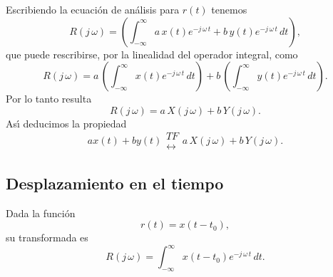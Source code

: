 Escribiendo la ecuaci\'{o}n de an\'{a}lisis para $r\left( t\right)$
tenemos
\begin{equation}
        R\left( j \, \omega \right) =
        \left( \int_{-\infty }^{\infty } a \, x\left( t\right)e^{-j \, \omega \, t} + b \, y\left( t\right)e^{-j \, \omega \, t} \, dt\right),
\end{equation}
que puede rescribirse, por la linealidad del operador integral, como
\begin{equation}
        R\left( j \, \omega \right) =
        a \, \left( \int_{-\infty }^{\infty }x\left( t\right)e^{-j \, \omega \, t} \, dt\right) +
        b \, \left( \int_{-\infty }^{\infty }y\left( t\right)e^{-j \, \omega \, t} \, dt\right) .
\end{equation}
Por lo tanto resulta
\begin{equation}
        R\left( j \, \omega \right) =
                a \, X\left( j \, \omega \right) +
                b \, Y\left( j \, \omega \right).
\end{equation}
As\'{\i} deducimos la propiedad
\begin{equation}
        ax\left( t\right) +by\left( t\right) 
        \begin{array}{l}
                TF \\ 
                \leftrightarrow
        \end{array}
        a \, X\left( j \, \omega \right) +b \, Y\left( j \, \omega \right) .
\end{equation}

\subsection{Desplazamiento en el tiempo}

Dada la funci\'{o}n 
\begin{equation}
   r\left( t\right) = x\left( t-t_{0}\right) ,
\end{equation}
su transformada es
\begin{equation}
   R\left( j \, \omega \right) =  \int_{-\infty }^{\infty }x\left( t-t_{0}\right)e^{-j \, \omega \, t} \, dt.
\end{equation}


